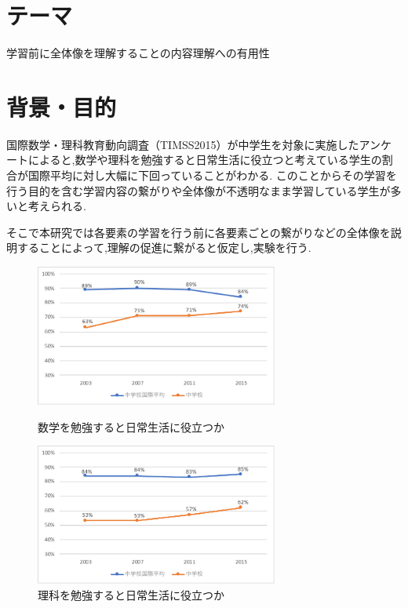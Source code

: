 \documentclass{jsarticle}
\begin{document}

\semi

\section{テーマ}
学習前に全体像を理解することの内容理解への有用性

\section{背景・目的}
国際数学・理科教育動向調査（TIMSS2015）が中学生を対象に実施したアンケートによると,数学や理科を勉強すると日常生活に役立つと考えている学生の割合が国際平均に対し大幅に下回っていることがわかる. \cite{timss} このことからその学習を行う目的を含む学習内容の繋がりや全体像が不透明なまま学習している学生が多いと考えられる.

そこで本研究では各要素の学習を行う前に各要素ごとの繋がりなどの全体像を説明することによって,理解の促進に繋がると仮定し,実験を行う.



\begin{figure}[H]
\begin{minipage}{0.5\hsize}
\begin{center}
\includegraphics[width=8cm]{0717-1.pdf}
\end{center}
\caption{数学を勉強すると日常生活に役立つか}
\end{minipage}
\begin{minipage}{0.5\hsize}
\begin{center}
\includegraphics[width=8cm]{0717-2.pdf}
\end{center}
\caption{理科を勉強すると日常生活に役立つか}
\end{minipage}
\end{figure}
\end{document}
